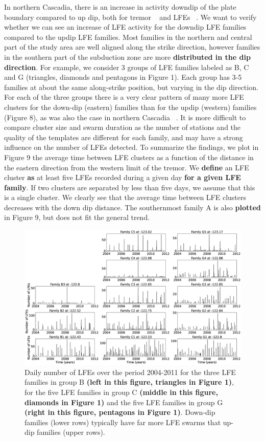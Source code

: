 \documentclass[draft]{agujournal2019}
\begin{document}
In northern Cascadia, there is an increase in activity downdip of the plate boundary compared to up dip, both for tremor ~\cite{WEC_2011} and LFEs ~\cite{SWE_2019}. We want to verify whether we can see an increase of LFE activity for the downdip LFE families compared to the updip LFE families. Most families in the northern and central part of the study area are well aligned along the strike direction, however families in the southern part of the subduction zone are more \textbf{distributed in the dip direction}. For example, we consider 3 groups of LFE families labeled as B, C and G (triangles, diamonds and pentagons in Figure 1). Each group has 3-5 families at about the same along-strike position, but varying in the dip direction. For each of the three groups there is a very clear pattern of many more LFE clusters for the down-dip (eastern) families than for the updip (western) families (Figure 8), as was also the case in northern Cascadia ~\cite{SWE_2019}. It is more difficult to compare cluster size and swarm duration as the number of stations and the quality of the templates are different for each family, and may have a strong influence on the number of LFEs detected. To summarize the findings, we plot in Figure 9 the average time between LFE clusters as a function of the distance in the eastern direction from the western limit of the tremor. We \textbf{define} an LFE cluster \textbf{as} at least five LFEs recorded during a given day \textbf{for a given LFE family}. If two clusters are separated by less than five days, we assume that this is a single cluster. We clearly see that the average time between LFE clusters decreases with the down dip distance. The southernmost family A is also \textbf{plotted} in Figure 9, but does not fit the general trend.\\

\begin{figure}
\noindent\includegraphics[width=\textwidth, trim={0cm 0cm 0cm 0cm},clip]{figures/set_daily_LFEs.eps}
\caption{Daily number of LFEs over the period 2004-2011 for the three LFE families in group B \textbf{(left in this figure, triangles in Figure 1)}, for the five LFE families in group C \textbf{(middle in this figure, diamonds in Figure 1)} and the five LFE families in group G \textbf{(right in this figure, pentagons in Figure 1)}. Down-dip families (lower rows) typically have far more LFE swarms that up-dip families (upper rows).}
\label{pngfiguresample}
\end{figure}
\end{document}
